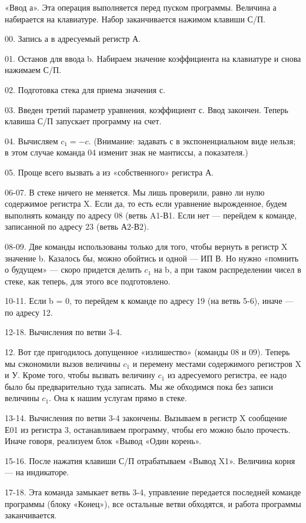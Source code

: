 \documentclass[11pt,a4paper,oneside]{article}
\begin{document}
«Ввод а». Эта операция выполняется перед пуском программы. Величина а набирается на клавиатуре. Набор заканчивается нажимом клавиши С/П.

00. Запись а в адресуемый регистр А.

01. Останов для ввода b. Набираем значение коэффициента на клавиатуре и снова нажимаем С/П.

02. Подготовка стека для приема значения с.

03. Введен третий параметр уравнения, коэффициент с. Ввод закончен. Теперь клавиша С/П запускает программу на счет.

04. Вычисляем $c_{1} =-c$. (Внимание: задавать с в экспоненциальном виде нельзя; в этом случае команда 04 изменит знак не мантиссы, а показателя.)

05. Проще всего вызвать а из «собственного» регистра А.

06-07. В стеке ничего не меняется. Мы лишь проверили, равно ли нулю содержимое регистра X. Если да, то есть если уравнение вырожденное, будем выполнять команду по адресу 08 (ветвь A1-В1. Если нет — перейдем к команде, записанной по адресу 23 (ветвь А2-В2).

08-09. Две команды использованы только для того, чтобы вернуть в регистр X значение b. Казалось бы, можно обойтись и одной — ИП В. Но нужно «помнить о будущем» — скоро придется делить $c_{1}$ на b, а при таком распределении чисел в стеке, как теперь, для этого все подготовлено.

10-11. Если b = 0, то перейдем к команде по адресу 19 (на ветвь 5-6), иначе — по адресу 12.

12-18. Вычисления по ветви 3-4.

12. Вот где пригодилось допущенное «излишество» (команды 08 и 09). Теперь мы сэкономили вызов величины $c_{1}$ и перемену местами содержимого регистров X и У. Кроме того, чтобы вызвать величину $c_{1}$ из адресуемого регистра, ее надо было бы предварительно туда записать. Мы же обходимся пока без записи величины $c_{1}$. Она к нашим услугам прямо в стеке.

13-14. Вычисления по ветви 3-4 закончены. Вызываем в регистр X сообщение Е01 из регистра 3, останавливаем программу, чтобы его можно было прочесть. Иначе говоря, реализуем блок «Вывод «Один корень».

15-16. После нажатия клавиши С/П отрабатываем «Вывод X1». Величина корня — на индикаторе.

17-18. Эта команда замыкает ветвь 3-4, управление передается последней команде программы (блоку «Конец»), все остальные ветви обходятся, и работа программы заканчивается.
\end{document}
